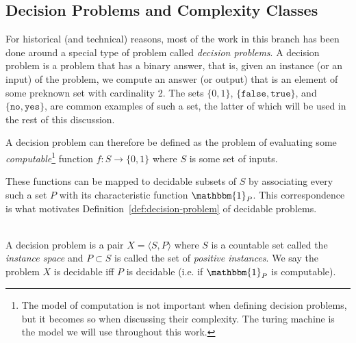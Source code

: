 \subsection{Decision Problems and Complexity Classes}

For historical (and technical) reasons, most of the work in this branch has been done around a special type of problem called \emph{decision problems}. A decision problem is a problem that has a binary answer, that is, given an instance (or an input) of the problem, we compute an answer (or output) that is an element of some preknown set with cardinality 2. The sets \(\{0, 1\}\), \(\{\texttt{false}, \texttt{true}\}\), and \(\{\texttt{no}, \texttt{yes}\}\), are common examples of such a set, the latter of which will be used in the rest of this discussion.

A decision problem can therefore be defined as the problem of evaluating some \emph{computable}\footnote{The model of computation is not important when defining decision problems, but it becomes so when discussing their complexity. The turing machine is the model we will use throughout this work.} function \(f: S \rightarrow \{0, 1\}\) where \(S\) is some set of inputs.

These functions can be mapped to decidable subsets of \(S\) by associating every such a set \(P\) with its characteristic function \(\mathbbm{1}_P\). This correspondence is what motivates Definition~\ref{def:decision-problem} of decidable problems.

\begin{definition}\ \\
    \label{def:decision-problem}
    A decision problem is a pair \(X = \langle S, P \rangle\) where \(S\) is a countable set called the \emph{instance space} and \(P \subset S\) is called the set of \emph{positive instances}. We say the problem \(X\) is decidable iff \(P\) is decidable (i.e. if \(\mathbbm{1}_P\) is computable).
\end{definition}

